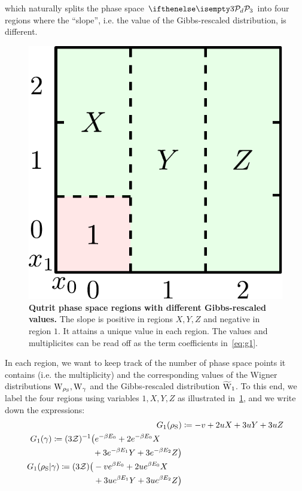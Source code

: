 \documentclass[pra,
aps,
twocolumn,
superscriptaddress,
groupedaddress,
nofootinbib,
reprint
]{revtex4-1}
\begin{document}
which naturally splits the phase space $\pd[3]$ into four regions where the ``slope'', i.e. the value of the Gibbs-rescaled distribution, is different.
\begin{figure}[h]
    \centering
    \includegraphics[scale=0.5]{figs/pd_split_thermal.pdf}
    \caption{\textbf{Qutrit phase space regions with different Gibbs-rescaled values.}
    The slope is positive in regions $X,Y,Z$ and negative in region $1$.
    It attains a unique value in each region.
    The values and multiplicites can be read off as the term coefficients in~\cref{eq:g1}.
    }
    \label{fig:pd_split_thermal}
\end{figure}
In each region, we want to keep track of the number of phase space points it contains (i.e. the multiplicity) and the corresponding values of the Wigner distributions $\W{\noisys}, \W{\gamma}$ and the Gibbs-rescaled distribution $\widetilde{\rm{W}}_1$. 
To this end, we label the four regions using variables $1,X,Y,Z$ as illustrated in~\cref{fig:pd_split_thermal}, and we write down the expressions:
\begin{align}\label{eq:g1}
	G_1(\rho_{\rm{S}}) &\coloneqq -v + 2u X + 3u Y + 3u Z \\
	\begin{split}
	G_1(\gamma) &\coloneqq (3\mathcal{Z})^{-1} \big( e^{-\beta E_0} + 2e^{-\beta E_0} X \\
	&\hspace{49pt} + 3e^{-\beta E_1} Y + 3e^{-\beta E_2} Z \big) 
	\end{split}
	\\
	\begin{split}
	G_1(\rho_{\rm{S}}|\gamma) &\coloneqq (3\mathcal{Z}) \big( -v e^{\beta E_0} + 2u e^{\beta E_0} X \\
	&\hspace{41pt} + 3u e^{\beta E_1} Y + 3u e^{\beta E_2} Z \big)
	\end{split}
\end{align}
\end{document}
